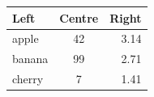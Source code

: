 \documentclass{article}
\begin{document}
\begin{tabular}{|l|c|r|}
  \hline
  Left & Centre & Right \\
  \hline
  apple & 42 & 3.14 \\
  banana & 99 & 2.71 \\
  cherry & 7 & 1.41 \\
  \hline
\end{tabular}
\end{document}
